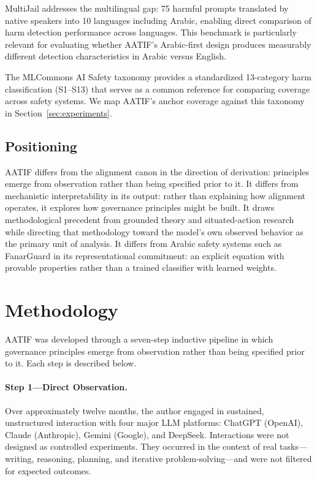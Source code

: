 \documentclass[11pt,a4paper]{article}
\begin{document}
MultiJail \citep{multijail2024} addresses the multilingual gap: 75 harmful prompts translated by native speakers into 10 languages including Arabic, enabling direct comparison of harm detection performance across languages. This benchmark is particularly relevant for evaluating whether AATIF's Arabic-first design produces measurably different detection characteristics in Arabic versus English.

The MLCommons AI Safety taxonomy \citep{mlcommons2024} provides a standardized 13-category harm classification (S1--S13) that serves as a common reference for comparing coverage across safety systems. We map AATIF's anchor coverage against this taxonomy in Section~\ref{sec:experiments}.

\subsection{Positioning}

AATIF differs from the alignment canon in the direction of derivation: principles emerge from observation rather than being specified prior to it. It differs from mechanistic interpretability in its output: rather than explaining how alignment operates, it explores how governance principles might be built. It draws methodological precedent from grounded theory and situated-action research while directing that methodology toward the model's own observed behavior as the primary unit of analysis. It differs from Arabic safety systems such as FanarGuard in its representational commitment: an explicit equation with provable properties rather than a trained classifier with learned weights.

\section{Methodology}

AATIF was developed through a seven-step inductive pipeline in which governance principles emerge from observation rather than being specified prior to it. Each step is described below.

\paragraph{Step 1---Direct Observation.}
Over approximately twelve months, the author engaged in sustained, unstructured interaction with four major LLM platforms: ChatGPT (OpenAI), Claude (Anthropic), Gemini (Google), and DeepSeek. Interactions were not designed as controlled experiments. They occurred in the context of real tasks---writing, reasoning, planning, and iterative problem-solving---and were not filtered for expected outcomes.
\end{document}
